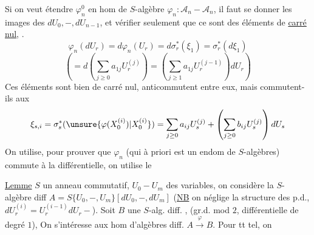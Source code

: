 Si on veut étendre $\varphi_n^0$ en \deleted{$\unsure{\varphi}$} hom de $S$-algèbre $\varphi_n:\mathcal A_n-\mathcal A_n$, il faut se donner les images des $dU_0,-,dU_{n-1}$, et vérifier seulement que ce sont des éléments de \uline{carré nul},  .
\[
\varphi_n(dU_r)=d\varphi_n(U_r)=d\sigma_r^*(\xi_1)=\sigma_r^*(d\xi_1)
\]
\[
\left(=d\left(\sum_{j\geq0}a_{1j}U_r^{(j)}\right)
=\left(\sum_{j\geq1}a_{1j}U_r^{(j-1)}\right)dU_r\right)
\]
Ces éléments sont bien de carré nul, anticommutent entre eux, mais commutent-ils aux
\[
\xi_{s,i}=\sigma_s^*(\unsure{\varphi(X_0^{(i)})|X_0^{(i)}})
=\sum_{j\geq0}a_{ij}U_s^{(j)}+\left(\sum_{j\geq0}b_{ij}U_s^{(j)}\right)dU_s
\]
On utilise, pour prouver que $\varphi_n$ (qui à priori est un endom de $S$-algèbres) commute à la différentielle, on utilise le

\uline{Lemme} $S$ un anneau commutatif, $U_0- U_m$ des variables, on considère  la $S$-algèbre diff $A=S\{U_0,-,U_m\}[dU_0,-,dU_m]$
(\uline{NB} on néglige la structure des p.d.,  $dU_r^{(i)}=U_r^{(i-1)}dU_r-$).
Soit $B$ une $S$-alg. diff. , (gr.d. mod $2$, différentielle de degré $1$),
On s'intéresse aux hom d'algèbres diff. $A\xrightarrow{\varphi}B$. Pour tt tel, on
